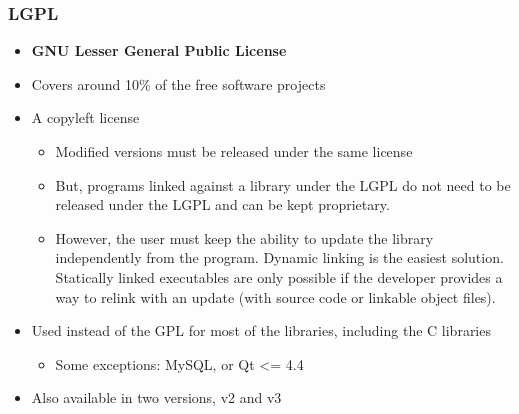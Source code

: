 \begin{frame}
  \frametitle{LGPL}
  \begin{itemize}
  \item {\bf GNU Lesser General Public License}
  \item Covers around 10\% of the free software projects
  \item A copyleft license
    \begin{itemize}
    \item Modified versions must be released under the same license
    \item But, programs linked against a library under the LGPL do not
      need to be released under the LGPL and can be kept proprietary.
    \item However, the user must keep the ability to update the
      library independently from the program. Dynamic linking is the
      easiest solution. Statically linked executables are only possible
      if the developer provides a way to relink with an update
      (with source code or linkable object files).
    \end{itemize}
  \item Used instead of the GPL for most of the libraries, including
    the C libraries
    \begin{itemize}
    \item Some exceptions: MySQL, or Qt \textless = 4.4
    \end{itemize}
  \item Also available in two versions, v2 and v3
  \end{itemize}
\end{frame}

